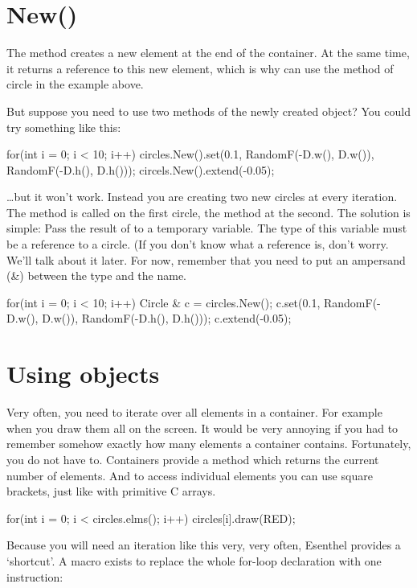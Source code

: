 \section{New()}
The method  creates a new element at the end of the container. At the same time, it returns a reference to this new element, which is why can use the  method of circle in the example above. 

But suppose you need to use two methods of the newly created object? You could try something like this:

\begin{code}
for(int i = 0; i < 10; i++)
{
	circles.New().set(0.1, RandomF(-D.w(), D.w()), RandomF(-D.h(), D.h()));
	circels.New().extend(-0.05);
}
\end{code}

\ldots but it won't work. Instead you are creating two new circles at every iteration. The method  is called on the first circle, the method  at the second. The solution is simple: Pass the result of  to a temporary variable. The type of this variable must be a reference to a circle. (If you don't know what a reference is, don't worry. We'll talk about it later. For now, remember that you need to put an ampersand (\&) between the type and the name.

\begin{code}
for(int i = 0; i < 10; i++)
{
	Circle & c = circles.New();
	c.set(0.1, RandomF(-D.w(), D.w()), RandomF(-D.h(), D.h()));
	c.extend(-0.05);
}
\end{code}

\section{Using objects}
Very often, you need to iterate over all elements in a container. For example when you draw them all on the screen. It would be very annoying if you had to remember somehow exactly how many elements a container contains. Fortunately, you do not have to. Containers provide a method  which returns the current number of elements. And to access individual elements you can use square brackets, just like with primitive C arrays.

\begin{code}
for(int i = 0; i < circles.elms(); i++)
{
  circles[i].draw(RED);
}
\end{code}

Because you will need an iteration like this very, very often, Esenthel provides a `shortcut'. A macro  exists to replace the whole for-loop declaration with one instruction:

